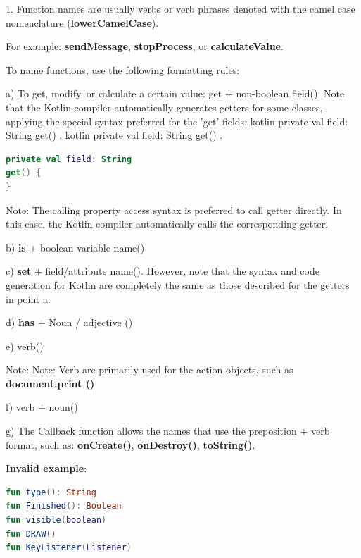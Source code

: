 {{{{1.	Function names are usually verbs or verb phrases denoted with the camel case nomenclature (\textbf{lowerCamelCase}).

For example: \textbf{sendMessage}, \textbf{stopProcess}, or \textbf{calculateValue}.

To name functions, use the following formatting rules:



a) To get, modify, or calculate a certain value: get + non-boolean field(). Note that the Kotlin compiler automatically generates getters for some classes, applying the special syntax preferred for the 'get' fields: kotlin private val field: String get() { }. kotlin private val field: String get() { }.

\begin{lstlisting}[language=Kotlin]
private val field: String
get() {
}
\end{lstlisting}
Note: The calling property access syntax is preferred to call getter directly. In this case, the Kotlin compiler automatically calls the corresponding getter.



b) \textbf{is} + boolean variable name()



c) \textbf{set} + field/attribute name(). However, note that the syntax and code generation for Kotlin are completely the same as those described for the getters in point a.



d) \textbf{has} + Noun / adjective ()



e) verb()

Note: Note: Verb are primarily used for the action objects, such as \textbf{document.print ()}



f) verb + noun() 



g) The Callback function allows the names that use the preposition + verb format, such as: \textbf{onCreate()}, \textbf{onDestroy()}, \textbf{toString()}.



\textbf{Invalid example}: 



\begin{lstlisting}[language=Kotlin]
fun type(): String
fun Finished(): Boolean
fun visible(boolean)
fun DRAW()
fun KeyListener(Listener)
\end{lstlisting}


}}}}
